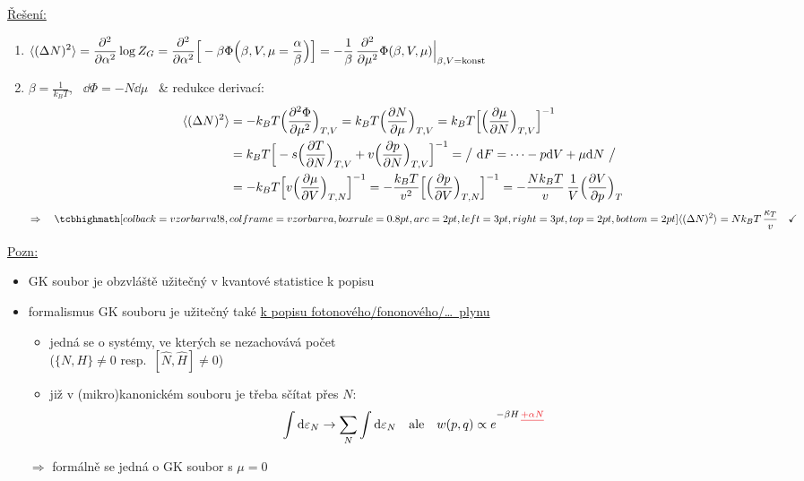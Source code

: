 \underline{Řešení:}
\begin{enumerate}[label=\arabic*)]
  \item $\displaystyle \langle(\Delta N)^2\rangle = \pdv[2]{\alpha}\log Z_G = \pdv[2]{\alpha}\Big[-\beta\Phi\Big(\beta,V,\mu = \frac{\alpha}{\beta}\Big)\Big]
        = -\frac1\beta\,\pdv[2]{\mu}\Phi(\beta,V,\mu)\Big|_{\beta,V = \text{konst}}$
  \item $\beta = \frac{1}{k_BT}$, \ $\dd\Phi = -N\dd\mu$ \ \& redukce derivací:
  \begin{align*}
    \langle(\Delta N)^2\rangle &= -k_BT\Big(\pdv[2]{\Phi}{\mu}\Big)_{T,V} = k_BT\Big(\pdv{N}{\mu}\Big)_{T,V}
      = k_BT\Big[\Big(\pdv{\mu}{N}\Big)_{T,V}\Big]^{-1} \\
    &= k_BT\Big[-s\Big(\pdv{T}{N}\Big)_{T,V} + v\Big(\pdv{p}{N}\Big)_{T,V}\Big]^{-1}
      = \big/\ \dd F = \dots - p\dd V + \mu\dd N\ \big/ \\
    &= -k_BT\Big[v\Big(\pdv{\mu}{V}\Big)_{T,N}\Big]^{-1}
      = -\frac{k_BT}{v^2}\Big[\Big(\pdv{p}{V}\Big)_{T,N}\Big]^{-1}
      = -\frac{Nk_BT}{v}\,\frac1V\Big(\pdv{V}{p}\Big)_T
  \end{align*}
  \[
    \Rightarrow\quad \vzorec{\langle(\Delta N)^2\rangle = Nk_BT\,\frac{\kappa_T}{v}} \quad \checkmark
  \]
\end{enumerate}

\underline{Pozn:}
\begin{itemize}
  \item GK soubor je obzvláště užitečný v kvantové statistice k popisu 
  \item formalismus GK souboru je užitečný také \underline{k popisu fotonového/fononového/\dots\ plynu}
  \begin{itemize}
    \item[--] jedná se o systémy, ve kterých se nezachovává počet  \\
              ($\{N,H\}\neq 0$ resp.\ $[\hat N,\hat H]\neq 0$)
    \item[$\Rightarrow$] již v (mikro)kanonickém souboru je třeba sčítat přes $N$:
    \[
      \int\dd\varepsilon_N \to \sum_N\int\dd\varepsilon_N \quad\text{ale}\quad
      w(p,q) \propto e^{-\beta H\,\textcolor{Red}{\sout{+\alpha N}}}
    \]
  \end{itemize}
  $\Rightarrow$ formálně se jedná o GK soubor s \underline{$\mu = 0$}
\end{itemize}

